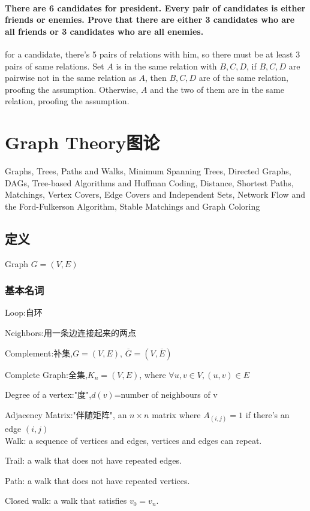 \documentclass[12pt,a4paper]{ctexrep}
\begin{document}
\subsubsection{There are 6 candidates for president. Every pair of candidates is either friends or enemies. Prove that there are either 3 candidates who are all friends or 3 candidates who are all enemies.}
for a candidate, there's 5 pairs of relations with him, so there must be at least 3 pairs of same relations. Set $A$ is in the same relation with $B,C,D$, if $B,C,D$ are pairwise not in the same relation as $A$, then $B,C,D$ are of the same relation, proofing the assumption. Otherwise, $A$ and the two of them are in the same relation, proofing the assumption.

\chapter{Graph Theory图论}
Graphs, Trees, Paths and Walks, Minimum Spanning Trees, Directed Graphs, DAGs, Tree-based Algorithms and Huffman Coding, Distance, Shortest Paths, Matchings, Vertex Covers, Edge Covers and Independent Sets, Network Flow and the Ford-Fulkerson Algorithm, Stable Matchings and Graph Coloring
\section{定义}
Graph $G = (V,E)$
\subsection{基本名词}
Loop:自环

Neighbors:用一条边连接起来的两点

Complement:补集,$G=(V,E),\,\overline{G}=(V,\overline{E})$

Complete Graph:全集,$K_{n} = (V,E)$, where $\forall u,v \in V, (u,v)\in E$

Degree of a vertex:"度",$d(v)$=number of neighbours of v

Adjacency Matrix:"伴随矩阵", an $n\times n$ matrix where $A_{(i,j)} = 1$ if there's an edge $(i,j)$\\

Walk: a sequence of vertices and edges, vertices and edges can repeat.

Trail: a walk that does not have repeated edges.

Path: a walk that does not have repeated vertices.

Closed walk: a walk that satisfies $v_{0} = v_{n}$.
\end{document}
